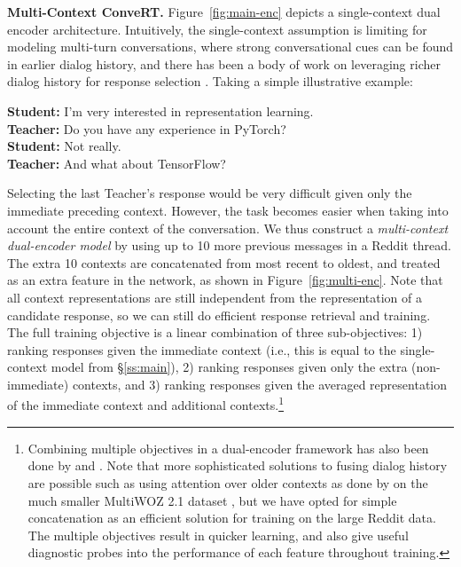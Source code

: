 \documentclass[11pt,a4paper]{article}
\begin{document}
\vspace{1.4mm}
\noindent \textbf{Multi-Context ConveRT.}
\label{ss:contextual}
 Figure~\ref{fig:main-enc} depicts a single-context dual encoder architecture. Intuitively, the single-context assumption is limiting for modeling multi-turn conversations, where strong conversational cues can be found in earlier dialog history, and there has been a body of work on leveraging richer dialog history for response selection \cite{Chaudhuri:2018conll,Zhou:2018acl,Humeau:2019arxiv}. Taking a simple illustrative example: 



{\footnotesize
\vspace{1.4mm}
\indent \textbf{Student:} I'm very interested in representation learning. \\
\indent \textbf{Teacher:} Do you have any experience in PyTorch? \\
\indent \textbf{Student:} Not really. \\
\indent \textbf{Teacher:} And what about TensorFlow?}\vspace{1.4mm}

\noindent Selecting the last Teacher's response would be very difficult given only the immediate preceding context. However, the task becomes easier when taking into account the entire context of the conversation. We thus construct a \textit{multi-context dual-encoder model} by using up to 10 more previous messages in a Reddit thread. The extra 10 contexts are concatenated from most recent to oldest, and treated as an extra feature in the network, as shown in Figure~\ref{fig:multi-enc}. Note that all context representations are still independent from the representation of a candidate response, so we can still do efficient response retrieval and training. The full training objective is a linear combination of three sub-objectives: 1) ranking responses given the immediate context (i.e., this is equal to the single-context model from \S\ref{ss:main}), 2) ranking responses given only the extra (non-immediate) contexts, and 3) ranking responses given the averaged representation of the immediate context and additional contexts.\footnote{Combining multiple objectives in a dual-encoder framework has also been done by  and . Note that more sophisticated solutions to fusing dialog  history are possible such as using attention over older contexts as done by  on the much smaller MultiWOZ 2.1 dataset \cite{Eric:2019arxiv}, but we have opted for simple concatenation as an efficient solution for training on the large Reddit data. The multiple objectives result in quicker learning, and also give useful diagnostic probes into the performance of each feature throughout training.}
\end{document}

